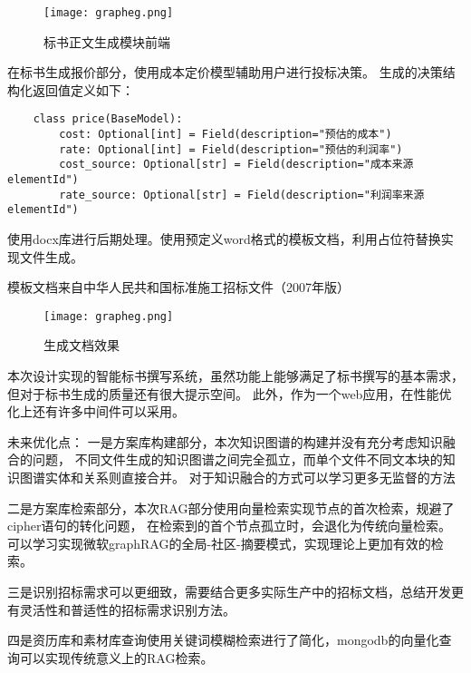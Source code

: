 \documentclass{xmu}
\begin{document}
    \begin{figure}[!htb]
        \centering
        \texttt{[image: grapheg.png]}\\
        \caption{标书正文生成模块前端
        }\label{}
    \end{figure}

    在标书生成报价部分，使用成本定价模型辅助用户进行投标决策。
    生成的决策结构化返回值定义如下：
    \begin{verbatim}
    class price(BaseModel):
        cost: Optional[int] = Field(description="预估的成本")
        rate: Optional[int] = Field(description="预估的利润率")
        cost_source: Optional[str] = Field(description="成本来源elementId")
        rate_source: Optional[str] = Field(description="利润率来源elementId")
    \end{verbatim}

    使用docx库进行后期处理。使用预定义word格式的模板文档，利用占位符替换实现文件生成。

    模板文档来自中华人民共和国标准施工招标文件（2007年版）

    \begin{figure}[!htb]
        \centering
        \texttt{[image: grapheg.png]}\\
        \caption{生成文档效果
        }\label{}
    \end{figure}
本次设计实现的智能标书撰写系统，虽然功能上能够满足了标书撰写的基本需求，
但对于标书生成的质量还有很大提示空间。
此外，作为一个web应用，在性能优化上还有许多中间件可以采用。

未来优化点：
一是方案库构建部分，本次知识图谱的构建并没有充分考虑知识融合的问题，
不同文件生成的知识图谱之间完全孤立，而单个文件不同文本块的知识图谱实体和关系则直接合并。
对于知识融合的方式可以学习更多无监督的方法

二是方案库检索部分，本次RAG部分使用向量检索实现节点的首次检索，规避了cipher语句的转化问题，
在检索到的首个节点孤立时，会退化为传统向量检索。
可以学习实现微软graphRAG的全局-社区-摘要模式，实现理论上更加有效的检索。

三是识别招标需求可以更细致，需要结合更多实际生产中的招标文档，总结开发更有灵活性和普适性的招标需求识别方法。

四是资历库和素材库查询使用关键词模糊检索进行了简化，mongodb的向量化查询可以实现传统意义上的RAG检索。
\end{document}
